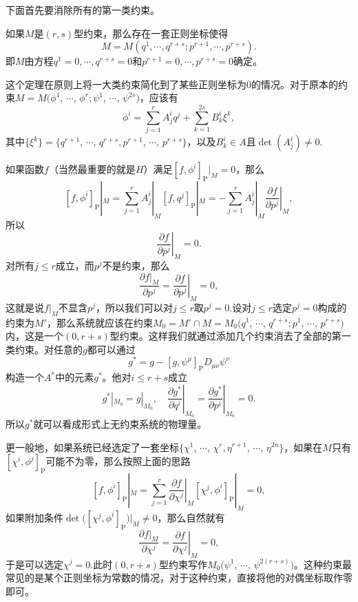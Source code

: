下面首先要消除所有的第一类约束。
\begin{theo}
	如果$M$是$(r,s)$型约束，那么存在一套正则坐标使得
	\[
		M=M(q^1,\cdots,q^{r+s};p^{r+1},\cdots,p^{r+s}).
	\]
	即$M$由方程$q^1=0,\cdots,q^{r+s}=0$和$p^{r+1}=0,\cdots,p^{r+s}=0$确定。
\end{theo}
这个定理在原则上将一大类约束简化到了某些正则坐标为0的情况。对于原本的约束$M=M(\phi^1$, $\cdots$, $\phi^{r};\psi^{1}$, $\cdots$, $\psi^{2s})$，应该有
\[
	\phi^i=\sum_{j=1}^rA^i_jq^j+\sum_{k=1}^{2s}B^i_k\xi^k,
\]
其中$\{\xi^k\}=\{q^{r+1}$, $\cdots$, $q^{r+s},p^{r+1}$, $\cdots$, $p^{r+s}\}$，以及$B^i_k\in A$且$\det(A^i_j)\neq 0$.

如果函数$f$（当然最重要的就是$H$）满足$[f,\phi^i]_{\mathrm{P}}|_M=0$，那么
\[
	[f,\phi^i]_{\mathrm{P}}|_M=\sum_{j=1}^rA^i_j|_M[f,q^j]_{\mathrm{P}}|_M=-\sum_{j=1}^rA^i_j|_M\left.\frac{\partial f}{\partial p^j}\right|_M,
\]
所以
\[
	\left.\frac{\partial f}{\partial p^j}\right|_M=0.
\]
对所有$j\leq r$成立，而$p^j$不是约束，那么
\[
	\frac{\partial f|_M}{\partial p^j}=\left.\frac{\partial f}{\partial p^j}\right|_M=0,
\]
这就是说$f|_M$不显含$p^j$，所以我们可以对$j\leq r$取$p^j=0$.设对$j\leq r$选定$p^j=0$构成的约束为$M'$，那么系统就应该在约束$M_0=M'\cap M=M_0(q^1$, $\cdots$, $q^{r+s};p^1$, $\cdots$, $p^{r+s})$内，这是一个$(0,r+s)$型约束。这样我们就通过添加几个约束消去了全部的第一类约束。对任意的$g$都可以通过
\[
	g^*=g-[g,\psi^\mu]_{\mathrm{P}}D_{\mu\nu}\psi^\nu
\]
构造一个$A^*$中的元素$g^*$。他对$i\leq r+s$成立
\begin{equation}
	g^*|_{M_0}=g|_{M_0},\quad \left.\frac{\partial g^*}{\partial q^i}\right|_{M_0}=\left.\frac{\partial g^*}{\partial p^i}\right|_{M_0}=0.
	\label{s2:3}
\end{equation}
所以$g^*$就可以看成形式上无约束系统的物理量。

更一般地，如果系统已经选定了一套坐标$\{\chi^1$, $\cdots$, $\chi^r,\eta^{r+1}$, $\cdots$, $\eta^{2n}\}$，如果在$M$只有$[\chi^i,\phi^j]_{\mathrm{P}}$可能不为零，那么按照上面的思路
\[
	[f,\phi^i]_{\mathrm{P}}|_M=\sum_{j=1}^r\left.\frac{\partial f}{\partial \chi^j}\right|_M[\chi^j,\phi^i]_{\mathrm{P}}|_M=0,
\]
如果附加条件$\det\bigl([\chi^j,\phi^i]_{\mathrm{P}}\bigr)|_M\neq 0$，那么自然就有
\[
	\frac{\partial f|_M}{\partial \chi^j}=\left.\frac{\partial f}{\partial \chi^j}\right|_M=0,
\]
于是可以选定$\chi^j=0$.此时$(0,r+s)$型约束写作$M_0\bigl(\psi^{1}$, $\cdots$, $\psi^{2(r+s)}\bigr)$。这种约束最常见的是某个正则坐标为常数的情况，对于这种约束，直接将他的对偶坐标取作零即可。

